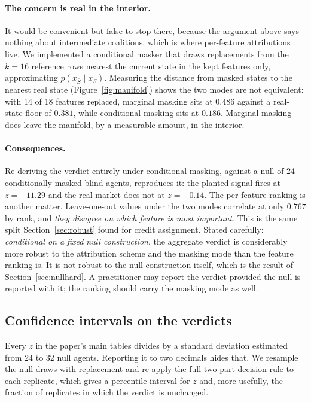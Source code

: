\documentclass[10pt,twocolumn]{article}
\begin{document}
\paragraph{The concern is real in the interior.}
It would be convenient but false to stop there, because the argument above says
nothing about intermediate coalitions, which is where per-feature attributions
live. We implemented a conditional masker that draws replacements from the $k=16$
reference rows nearest the current state in the kept features only, approximating
$p(x_{\bar S} \mid x_S)$. Measuring the distance from masked states to the
nearest real state (Figure~\ref{fig:manifold}) shows the two modes are not
equivalent: with 14 of 18 features replaced, marginal masking sits at $0.486$
against a real-state floor of $0.381$, while conditional masking sits at $0.186$.
Marginal masking does leave the manifold, by a measurable amount, in the interior.

\paragraph{Consequences.}
Re-deriving the verdict entirely under conditional masking, against a null of 24
conditionally-masked blind agents, reproduces it: the planted signal fires at
$z=+11.29$ and the real market does not at $z=-0.14$. The per-feature ranking is
another matter. Leave-one-out values under the two modes correlate at only
$0.767$ by rank, and \emph{they disagree on which feature is most important}.
This is the same split Section~\ref{sec:robust} found for credit assignment.
Stated carefully: \emph{conditional on a fixed null construction}, the aggregate
verdict is considerably more robust to the attribution scheme and the masking
mode than the feature ranking is. It is not robust to the null construction
itself, which is the result of Section~\ref{sec:nullhard}. A practitioner may
report the verdict provided the null is reported with it; the ranking should
carry the masking mode as well.

\subsection{Confidence intervals on the verdicts}
\label{sec:intervals}

Every $z$ in the paper's main tables divides by a standard deviation estimated
from 24 to 32 null agents. Reporting it to two decimals hides that. We resample the null
draws with replacement and re-apply the full two-part decision rule to each
replicate, which gives a percentile interval for $z$ and, more usefully, the
fraction of replicates in which the verdict is unchanged.
\end{document}
